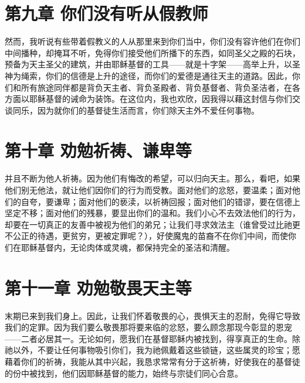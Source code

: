 
\section{第九章 你们没有听从假教师}

然而，我听说有些带着假教义的人从那里来到你们当中，你们没有容许他们在你们中间播种，却掩耳不听，免得你们接受他们所播下的东西，如同圣父之殿的石块，预备为天主圣父的建筑，并由耶稣基督的工具——就是十字架——高举上升，以圣神为绳索，你们的信德是上升的途径，而你们的爱德是通往天主的道路。因此，你们和所有旅途同伴都是背负天主者、背负圣殿者、背负基督者、背负圣洁者，在各方面以耶稣基督的诫命为装饰。在这位内，我也欢欣，因我得以藉这封信与你们交谈同乐，因为就你们的基督徒生活而言，你们除天主外不爱任何事物。\par


\section{第十章 劝勉祈祷、谦卑等}

并且不断为他人祈祷。因为他们有悔改的希望，可以归向天主。那么，看吧，如果他们别无他法，就让他们因你们的行为而受教。面对他们的忿怒，要温柔；面对他们的自夸，要谦卑；面对他们的亵渎，以祈祷回报；面对他们的错谬，要在信德上坚定不移；面对他们的残暴，要显出你们的温和。我们小心不去效法他们的行为，却要在一切真正的友善中被视为他们的弟兄；让我们寻求效法主（谁曾受过比祂更不公正的待遇，更贫穷，更被定罪呢？），好使魔鬼的苗裔不在你们中间，而使你们在耶稣基督内，无论肉体或灵魂，都保持完全的圣洁和清醒。\par


\section{第十一章 劝勉敬畏天主等}

末期已来到我们身上。因此，让我们怀着敬畏的心，畏惧天主的忍耐，免得它导致我们的定罪。因为我们要么敬畏那将要来临的忿怒，要么顾念那现今彰显的恩宠——二者必居其一。无论如何，愿我们在基督耶稣内被找到，得享真正的生命。除祂以外，不要让任何事物吸引你们，我为祂佩戴着这些锁链，这些属灵的珍宝；愿藉着你们的祈祷，我能从其中兴起，我恳求常常有分于这祈祷，好使我在的基督徒的份中被找到，他们因耶稣基督的能力，始终与宗徒们同心合意。\par

